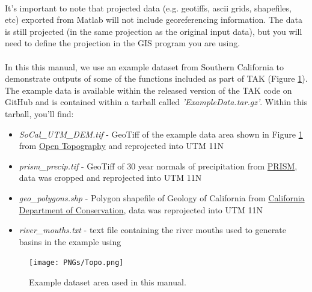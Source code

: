 \paragraph{}It's important to note that projected data (e.g. geotiffs, ascii grids, shapefiles, etc) exported from Matlab will not include georeferencing information. The data is still projected (in the same projection as the original input data), but you will need to define the projection in the GIS program you are using.

\paragraph{}In this this manual, we use an example dataset from Southern California to demonstrate outputs of some of the functions included as part of TAK (Figure \ref{fig:Topo}). The example data is available within the released version of the TAK code on GitHub and is contained within a tarball called \textit{'ExampleData.tar.gz'}. Within this tarball, you'll find:

\begin{itemize}
	\item \textit{SoCal\_UTM\_DEM.tif} - GeoTiff of the example data area shown in Figure \ref{fig:Topo} from \href{http://opentopography.org/}{Open Topography} and reprojected into UTM 11N
	\item \textit{prism\_precip.tif} - GeoTiff of 30 year normals of precipitation from \href{http://www.prism.oregonstate.edu/normals/}{PRISM}, data was cropped and reprojected into UTM 11N
	\item \textit{geo\_polygons.shp} - Polygon shapefile of Geology of California from \href{https://maps.conservation.ca.gov/cgs/#datalist}{California Department of Conservation}, data was reprojected into UTM 11N
	\item \textit{river\_mouths.txt} - text file containing the river mouths used to generate basins in the example using 
\end{itemize} 

\begin{figure}[H]
	\texttt{[image: PNGs/Topo.png]}
	\caption{Example dataset area used in this manual.}
	\label{fig:Topo}
\end{figure}

